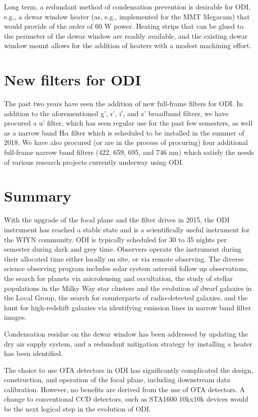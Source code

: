 \documentclass[]{spieman}
\begin{document}
Long term, a redundant method of condensation prevention is desirable for
ODI, e.g., a dewar window heater (as, e.g., implemented for the MMT 
Megacam\cite{McLeod2015}) that would provide of the
order of 60 W power. Heating strips that can be glued to the perimeter of the
dewar window are readily available, and the existing dewar window mount allows
for the addition of heaters with a modest machining effort.

\section{New filters for ODI}

The past two years have seen the addition of new full-frame filters for ODI.  In
addition to the aforementioned g', r', i', and z' broadband filters, we have
procured a u' filter, which has seen regular use for the past few semesters, as
well as a narrow band H$\alpha$ filter which is scheduled to be installed in the
summer of 2018. We have also procured (or are in the process of procuring) four
additional full-frame narrow band filters (422, 659, 695, and 746 nm) which
satisfy the needs of various research projects currently underway using ODI.

\section{Summary}

With the upgrade of the focal plane and the filter drives in 2015, the ODI
instrument has reached a stable state and is a scientifically useful instrument
for the WIYN community\cite{janesh2015, adams2015a, adams2015b, cannon2015, davis2015,
janowiecki2015, janowiecki2015PhDT, janesh2017, jewitt2017, leisman2017, rhode2017, 
wittmann2017, lee2018a, lee2018b, lee2018c,   gorsuch2018 }. ODI is typically scheduled for 30 to 35 nights per
semester during dark and grey time. Observers operate the instrument during
their allocated time either locally on site, or via remote observing. The
diverse science observing program includes solar system asteroid follow up
observations, the search for planets via microlensing and occultation, the study of stellar
populations in the  Milky Way star clusters and the evolution of dwarf galaxies
in the Local Group, the search for  counterparts of radio-detected galaxies, and
the hunt for high-redshift galaxies via identifying emission lines in narrow
band filter images.

Condensation residue on the dewar window has been addressed by updating the dry
air supply system, and a redundant  mitigation strategy by installing a heater
has been identified.

The choice to use  OTA detectors in ODI has significantly complicated the
design, construction, and operation of the focal plane, including downstream
data calibration. However, no benefits are derived from the use of OTA
detectors.  A change to conventional CCD detectors, such as STA1600 10kx10k
devices would be the next logical step in the evolution of ODI.



 

\end{document}
